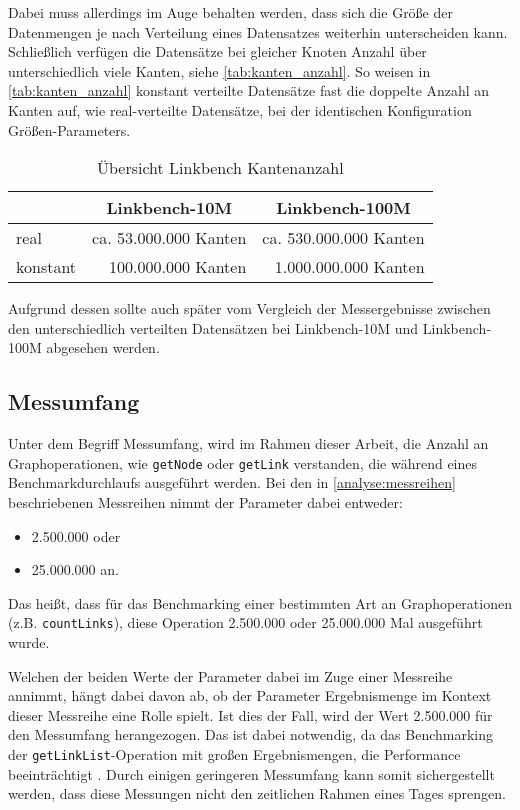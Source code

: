 Dabei muss allerdings im Auge behalten werden, dass sich die Größe der Datenmengen je nach Verteilung eines Datensatzes weiterhin unterscheiden kann. Schließlich verfügen die Datensätze bei gleicher Knoten Anzahl über unterschiedlich viele Kanten, siehe \autoref{tab:kanten_anzahl}. So weisen in \autoref{tab:kanten_anzahl} konstant verteilte Datensätze fast die doppelte Anzahl an Kanten auf, wie real-verteilte Datensätze, bei der identischen Konfiguration Größen-Parameters. 

\begin{table}[ht]
    \centering
    \begin{tabular}{l|r|r}
    \hline
    \rowcolor[HTML]{EFEFEF} 
    \multicolumn{1}{c|}{\cellcolor[HTML]{EFEFEF}\textbf{Verteilung}} & \multicolumn{1}{c|}{\cellcolor[HTML]{EFEFEF}\textbf{Linkbench-10M}} & \multicolumn{1}{c}{\cellcolor[HTML]{EFEFEF}\textbf{Linkbench-100M}} \\ \hline
    real & ca. 53.000.000 Kanten & ca. 530.000.000 Kanten \\
    konstant & 100.000.000 Kanten & 1.000.000.000 Kanten \\ \hline
    \end{tabular}
    \caption{Übersicht Linkbench Kantenanzahl}
    \label{tab:kanten_anzahl}
\end{table}

Aufgrund dessen sollte auch später vom Vergleich der Messergebnisse zwischen den unterschiedlich verteilten Datensätzen bei Linkbench-10M und Linkbench-100M abgesehen werden.

\subsection{Messumfang}
Unter dem Begriff Messumfang, wird im Rahmen dieser Arbeit, die Anzahl an Graphoperationen, wie \texttt{getNode} oder \texttt{getLink} verstanden, die während eines Benchmarkdurchlaufs ausgeführt werden. Bei den in \autoref{analyse:messreihen} beschriebenen Messreihen nimmt der Parameter dabei entweder:
\begin{itemize}
    \item 2.500.000 oder
    \item 25.000.000 an. 
\end{itemize}
Das heißt, dass für das Benchmarking einer bestimmten Art an Graphoperationen (z.B. \texttt{countLinks}), diese Operation 2.500.000 oder 25.000.000 Mal ausgeführt wurde. 

Welchen der beiden Werte der Parameter dabei im Zuge einer Messreihe annimmt, hängt dabei davon ab, ob der Parameter  Ergebnismenge im Kontext dieser Messreihe eine Rolle spielt. Ist dies der Fall, wird der Wert 2.500.000 für den Messumfang herangezogen. Das ist dabei notwendig, da das Benchmarking der \texttt{getLinkList}-Operation mit großen Ergebnismengen, die Performance beeinträchtigt . Durch einigen geringeren Messumfang kann somit sichergestellt werden, dass diese Messungen nicht den zeitlichen Rahmen eines Tages sprengen.

